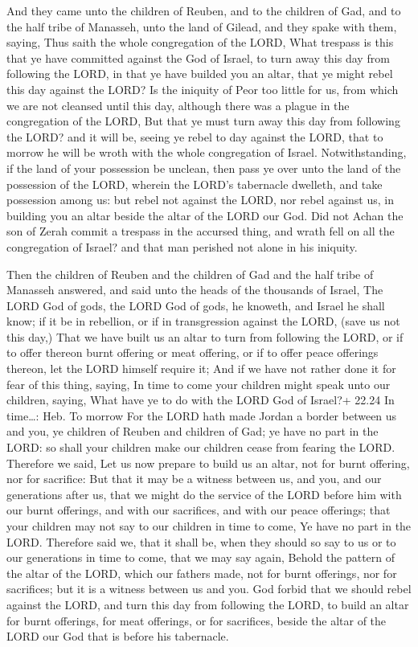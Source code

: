  And they came unto the children of Reuben, and to the
children of Gad, and to the half tribe of Manasseh, unto the land of
Gilead, and they spake with them, saying,  Thus saith the
whole congregation of the LORD, What trespass is this that ye have
committed against the God of Israel, to turn away this day from
following the LORD, in that ye have builded you an altar, that ye might
rebel this day against the LORD?  Is the iniquity of Peor
too little for us, from which we are not cleansed until this day,
although there was a plague in the congregation of the LORD,
 But that ye must turn away this day from following the
LORD? and it will be, seeing ye rebel to day against the LORD, that to
morrow he will be wroth with the whole congregation of Israel.
 Notwithstanding, if the land of your possession be
unclean, then pass ye over unto the land of the possession of the LORD,
wherein the LORD's tabernacle dwelleth, and take possession among us:
but rebel not against the LORD, nor rebel against us, in building you an
altar beside the altar of the LORD our God.  Did not Achan
the son of Zerah commit a trespass in the accursed thing, and wrath fell
on all the congregation of Israel? and that man perished not alone in
his iniquity.

 Then the children of Reuben and the children of Gad and
the half tribe of Manasseh answered, and said unto the heads of the
thousands of Israel,  The LORD God of gods, the LORD God of
gods, he knoweth, and Israel he shall know; if it be in rebellion, or if
in transgression against the LORD, (save us not this day,) 
That we have built us an altar to turn from following the LORD, or if to
offer thereon burnt offering or meat offering, or if to offer peace
offerings thereon, let the LORD himself require it;  And if
we have not rather done it for fear of this thing, saying, In time to
come your children might speak unto our children, saying, What have ye
to do with the LORD God of Israel?+ 22.24 In time\ldots: Heb. To morrow
 For the LORD hath made Jordan a border between us and you,
ye children of Reuben and children of Gad; ye have no part in the LORD:
so shall your children make our children cease from fearing the LORD.
 Therefore we said, Let us now prepare to build us an
altar, not for burnt offering, nor for sacrifice:  But that
it may be a witness between us, and you, and our generations after us,
that we might do the service of the LORD before him with our burnt
offerings, and with our sacrifices, and with our peace offerings; that
your children may not say to our children in time to come, Ye have no
part in the LORD.  Therefore said we, that it shall be,
when they should so say to us or to our generations in time to come,
that we may say again, Behold the pattern of the altar of the LORD,
which our fathers made, not for burnt offerings, nor for sacrifices; but
it is a witness between us and you.  God forbid that we
should rebel against the LORD, and turn this day from following the
LORD, to build an altar for burnt offerings, for meat offerings, or for
sacrifices, beside the altar of the LORD our God that is before his
tabernacle.

